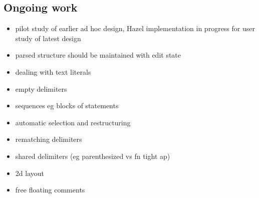 \subsection{Ongoing work}


\begin{itemize}
\item pilot study of earlier ad hoc design, Hazel implementation in progress for user study of latest design
\item parsed structure should be maintained with edit state
\item dealing with text literals
\item empty delimiters
\item sequences eg blocks of statements
\item automatic selection and restructuring
\item rematching delimiters
\item shared delimiters (eg parenthesized vs fn tight ap)
\item 2d layout
\item free floating comments
\end{itemize}